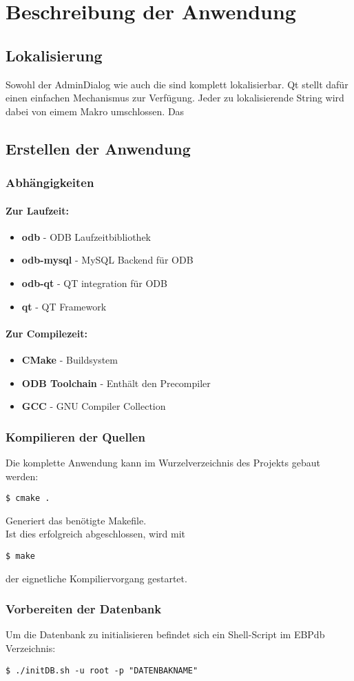 \section{Beschreibung der Anwendung}
\label{sec:beschreibung}
\subsection{Lokalisierung}
Sowohl der AdminDialog wie auch die \EBP sind komplett lokalisierbar. Qt stellt dafür einen einfachen Mechanismus zur Verfügung. Jeder zu lokalisierende String wird dabei von eimem Makro umschlossen. Das 
\subsection{Erstellen der Anwendung}
\subsubsection{Abhängigkeiten}
\paragraph{Zur Laufzeit:}
\begin{itemize}
	\item \textbf{odb} - ODB Laufzeitbibliothek
	\item \textbf{odb-mysql} - MySQL Backend für ODB
	\item \textbf{odb-qt} - QT integration für ODB
	\item \textbf{qt} - QT Framework
\end{itemize}
\paragraph{Zur Compilezeit:}
\begin{itemize}
	\item \textbf{CMake} - Buildsystem
	\item \textbf{ODB Toolchain} - Enthält den Precompiler
	\item \textbf{GCC} - GNU Compiler Collection
\end{itemize}
\subsubsection{Kompilieren der Quellen}
Die komplette Anwendung kann im Wurzelverzeichnis des Projekts gebaut werden:\\
\begin{lstlisting}
$ cmake .
\end{lstlisting}
Generiert das benötigte Makefile.\\
Ist dies erfolgreich abgeschlossen, wird mit\\
\begin{lstlisting}
$ make
\end{lstlisting}
der eignetliche Kompiliervorgang gestartet.\\
\subsubsection{Vorbereiten der Datenbank}
Um die Datenbank zu initialisieren befindet sich ein Shell-Script im EBPdb Verzeichnis:\\
\begin{lstlisting}
$ ./initDB.sh -u root -p "DATENBAKNAME"
\end{lstlisting}
